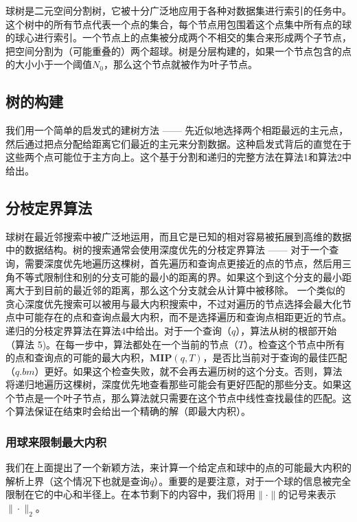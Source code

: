 \documentclass[twocolumn,a4paper]{article}
\begin{document}
球树\cite{29, 28}是二元空间分割树，它被十分广泛地应用于各种对数据集进行索引的任务中。这个树中的所有节点代表一个点的集合，每个节点用包围着这个点集中所有点的球的球心进行索引。一个节点上的点集被分成两个不相交的集合来形成两个子节点，把空间分割为（可能重叠的）两个超球。树是分层构建的，如果一个节点包含的点的大小小于一个阈值$N_0$，那么这个节点就被作为叶子节点。

\subsection{树的构建}

我们用一个简单的启发式的建树方法 ------ 先近似地选择两个相距最远\cite{28}的主元点，然后通过把点分配给距离它们最近的主元来分割数据。这种启发式背后的直觉在于这些两个点可能位于主方向上。这个基于分割和递归的完整方法在算法1和算法2中给出。

\subsection{分枝定界算法}

球树在最近邻搜索中被广泛地运用，而且它是已知的相对容易被拓展到高维\cite{28, 26}的数据中的数据结构。树的搜索通常会使用深度优先的分枝定界算法 ------ 对于一个查询，需要深度优先地遍历这棵树，首先遍历和查询点更接近的点的节点，然后用三角不等式限制住和别的分支可能的最小的距离的界。如果这个到这个分支的最小距离大于到目前的最近邻的距离，那么这个分支就会从计算中被移除。
一个类似的贪心深度优先搜索可以被用与最大内积搜索中，不过对遍历的节点选择会最大化节点中可能存在的点和查询点最大内积，而不是选择遍历和查询点相距更近的节点。递归的分枝定界算法在算法4中给出。对于一个查询（$q$），算法从树的根部开始（算法 5)。在每一步中，算法都处在一个当前的节点（$T$）。检查这个节点中所有的点和查询点的可能的最大内积，$\mathbf{MIP}(q,T)$，是否比当前对于查询的最佳匹配（$q.bm$）更好。如果这个检查失败，就不会再去遍历树的这个分支。否则，算法将递归地遍历这棵树，深度优先地查看那些可能会有更好匹配的那些分支。如果这个节点是一个叶子节点，那么算法就只需要在这个节点中线性查找最佳的匹配。这个算法保证在结束时会给出一个精确的解（即最大内积）。

\subsubsection{用球来限制最大内积}

我们在上面提出了一个新颖方法，来计算一个给定点和球中的点的可能最大内积的解析上界（这个情况下也就是查询$q$）。重要的是要注意，对于一个球的信息被完全限制在它的中心和半径上。在本节剩下的内容中，我们将用$\|\cdot\|$的记号来表示$\|\cdot\|_2$。
\end{document}
